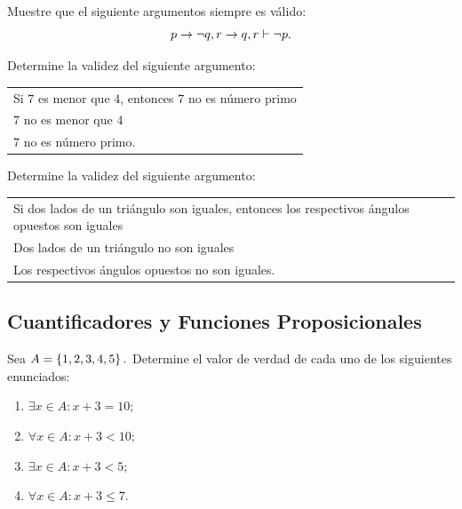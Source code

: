 \begin{problema}
  Muestre que el siguiente argumentos siempre es v\'alido:
 $$
 p \rightarrow \neg q, r \rightarrow q, r \vdash \neg p.
 $$
\end{problema}




 \begin{problema}
  Determine la validez del siguiente argumento:
  \begin{center}
\begin{tabular}{l}
Si $7$ es menor que $4$, entonces $7$ no es n\'umero primo\\
$7$ no es menor que $4$\\\hline
$7$ no es n\'umero primo.
  \end{tabular}
  \end{center}

 \end{problema}




 \begin{problema}
  Determine la validez del siguiente argumento:
  \begin{center}
\begin{tabular}{l}
Si dos lados de un tri\'angulo son iguales, entonces los respectivos \'angulos opuestos son iguales\\
Dos lados de un tri\'angulo no son iguales\\\hline
Los respectivos \'angulos opuestos no son iguales.
  \end{tabular}
  \end{center}

 \end{problema}



\subsection{Cuantificadores y Funciones Proposicionales}


 \begin{problema}
  Sea $A=\left\{ 1,2,3,4,5 \right\}.$ Determine el valor de verdad de cada uno de los siguientes enunciados:
  \begin{enumerate}
   \item $\exists x \in A: x+3=10;$ 
   \item $\forall x \in A: x+3<10;$ 
   \item $\exists x \in A: x+3<5;$ 
   \item $\forall x \in A: x+3 \leq 7.$
  \end{enumerate}

 \end{problema}




